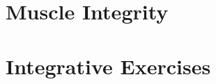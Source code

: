 \part{Muscle Integrity}




\part{Integrative Exercises}

% 

% 

\backmatter


\printbibliography[heading=bibintoc]
\printindex




